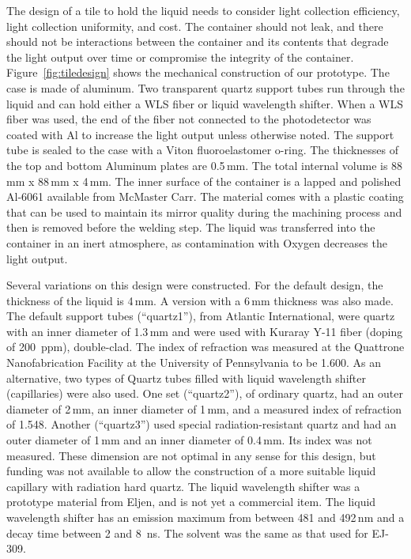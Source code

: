 \documentclass[review]{elsarticle}
\begin{document}
The design of a tile to hold the liquid needs to consider light
collection efficiency, light collection uniformity, and cost. The
container should not leak, and there should not be interactions
between the container and its contents that degrade the light output
over time or compromise the integrity of the
container. 
Figure~\ref{fig:tiledesign} shows the mechanical
construction of our prototype. The case is made of aluminum. Two
transparent quartz support tubes
run through the
liquid and can hold either a WLS fiber or liquid
wavelength shifter.
When a WLS fiber was
used, the end of the fiber not connected to the photodetector was
coated with Al to increase the light output unless otherwise
noted. The support tube is sealed to the case with a Viton
fluoroelastomer o-ring. The thicknesses of the top and bottom Aluminum
plates are 0.5\,mm. The total internal volume is 88\,mm x 88\,mm x
4\,mm. The inner surface of the container is a lapped and polished
Al-6061 available from McMaster Carr. The material comes with a
plastic coating that can be used to maintain its mirror quality during
the machining process and then is removed before the welding step. The
liquid was transferred into the container in an inert atmosphere, as
contamination with Oxygen decreases the light output.

Several variations on this design were constructed. For the default
design, the thickness of the liquid is 4\,mm. A version with a 6\,mm
thickness was also made. The default
support tubes (``quartz1''), from Atlantic International, were quartz with an inner
diameter of 1.3\,mm and were used with Kuraray Y-11 fiber (doping of
200~ppm), double-clad.
The index of refraction was measured at the Quattrone
Nanofabrication Facility at the University of Pennsylvania to be
1.600.
As an alternative, two types of
Quartz tubes filled with liquid wavelength
shifter (capillaries) were also used.  
One set (``quartz2''), of ordinary quartz, had an outer diameter of 2\,mm,
an inner diameter of 1\,mm, and a measured index of refraction of 1.548.
Another (``quartz3'') used special radiation-resistant quartz and had an outer diameter of 1\,mm and an
inner diameter of 0.4\,mm.  Its index was not measured.
These dimension are not optimal in any sense for this design, but
funding was not available to allow the construction of a more
suitable liquid capillary with radiation hard quartz.
The liquid wavelength shifter was a prototype
material from Eljen, and is not yet a commercial item. The liquid
wavelength shifter has an emission maximum from between 481 and 492\,nm
and a decay time between 2 and 8~ns. The solvent was the same as that
used for EJ-309. 
\end{document}
